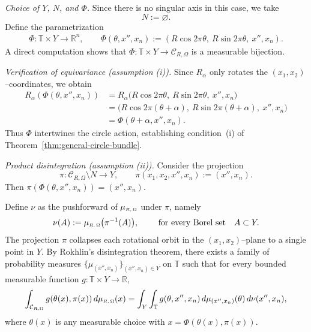 \documentclass[11pt]{article}
\numberwithin{equation}{section}
\theoremstyle{remark}
\begin{document}
\medskip\noindent
\emph{Choice of $Y$, $N$, and $\Phi$.}
Since there is no singular axis in this case, we take
\[
N := \varnothing.
\]
Define the parametrization
\begin{align}\label{definition:Phi-cylinder}
    \Phi: \mathbb{T} \times Y \to \mathbb{R}^n, \qquad
    \Phi(\theta,x'',x_n)
    := (R\cos 2\pi\theta,\ R\sin 2\pi\theta,\ x'',x_n).
\end{align}
A direct computation shows that
$\Phi:\mathbb{T}\times Y \to \mathcal{C}_{R,\Omega}$ is a measurable bijection.




\emph{Verification of equivariance (assumption (i)).}
Since $R_\alpha$ only rotates the $(x_1,x_2)$–coordinates, we obtain
\begin{align*}
R_\alpha(\Phi(\theta, x'', x_n)) 
 &= R_\alpha\big(R\cos 2\pi\theta,\ R\sin 2\pi\theta,\ x'', x_n\big)\\
 &= \big(R\cos 2\pi(\theta+\alpha),\ R\sin 2\pi(\theta+\alpha),\ x'', x_n\big)\\
 &= \Phi(\theta+\alpha, x'', x_n).
\end{align*}
Thus $\Phi$ intertwines the circle action, establishing condition~(i) of Theorem~\ref{thm:general-circle-bundle}.


\medskip\noindent
\emph{Product disintegration (assumption (ii)).}
Consider the projection
\[
\pi : \mathcal{C}_{R, \Omega}\setminus N \to Y,\qquad
\pi(x_1,x_2,x'',x_n) := (x'', x_n).
\]
Then $\pi(\Phi(\theta,x'',x_n) ) = (x'',x_n)$. 

Define $\nu$ as the pushforward of $\mu_{\text{\tiny $R,\Omega$}}$ under $\pi$, namely
\begin{align}\label{definition:measure-cylinder}
    \nu(A):=\mu_{\text{\tiny $R,\Omega$}}\big(\pi^{-1}(A)\big),
\qquad \text{ for every Borel set } ~~ A\subset Y.
\end{align}
The projection $\pi$ collapses each rotational orbit in the $(x_1,x_2)$–plane to a single point in $Y$.  
By Rokhlin’s disintegration theorem, there exists a family of 
probability measures $\{\mu_{(x'', x_n)}\}_{(x'', x_n)\in Y}$ on $\mathbb{T}$ such that for every bounded measurable function $g:\mathbb{T} \times Y\to\mathbb{R}$,
\begin{equation}\label{eq:cyl-disintegration}
\int_{\mathcal{C}_{R,\Omega}} g(\theta(x),\pi(x))\,d \mu_{\text{\tiny $R,\Omega$}}(x)
= \int_Y\int_\mathbb{T} g(\theta, x'', x_n)\,d\mu_{(x'', x_n)}(\theta)\,d\nu(x'', x_n),
\end{equation}
where $\theta(x)$ is any measurable choice with $x=\Phi(\theta(x),\pi(x))$.
\end{document}
